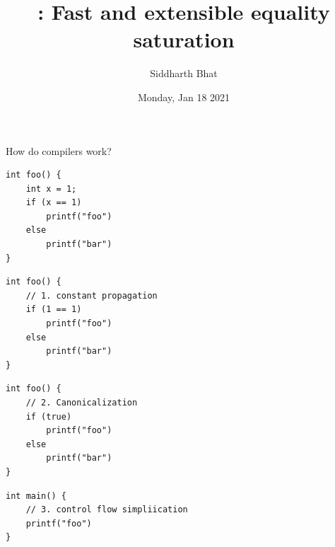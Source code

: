 \documentclass[8pt]{beamer}
\author{Siddharth Bhat}
\date{Monday, Jan 18 2021}
\title{\egg: Fast and extensible equality saturation}
\begin{document}


\maketitle

\begin{frame}[fragile]{How do compilers work?}

\begin{verbatim}
int foo() {
    int x = 1;
    if (x == 1)
        printf("foo")
    else
        printf("bar")
}
\end{verbatim}

\pause

\begin{verbatim}
int foo() {
    // 1. constant propagation
    if (1 == 1)
        printf("foo")
    else
        printf("bar")
}
\end{verbatim}

\pause

\begin{verbatim}
int foo() {
    // 2. Canonicalization
    if (true)
        printf("foo")
    else
        printf("bar")
}
\end{verbatim}

\pause

\begin{verbatim}
int main() {
    // 3. control flow simpliication
    printf("foo")
}
\end{verbatim}
\end{frame}
\end{document}
